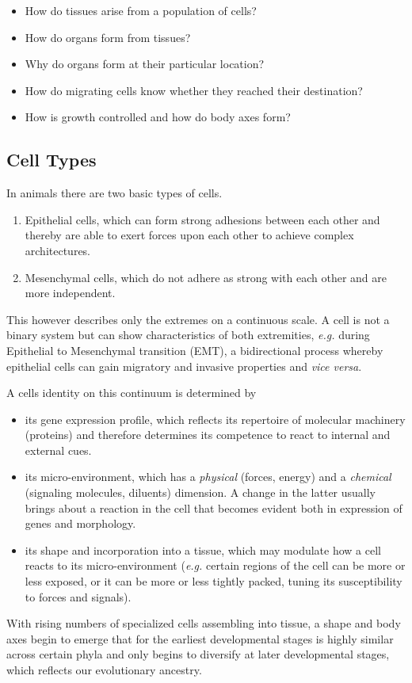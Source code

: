 \documentclass[10pt, b5paper, singlespacinge, twoside]{reedthesis} %
\providecommand{\tightlist}{%
  \setlength{\itemsep}{0pt}\setlength{\parskip}{0pt}}
\theoremstyle{definition}
\theoremstyle{definition}
\theoremstyle{definition}
\theoremstyle{remark}
\begin{document}
\begin{itemize}
\tightlist
\item
  How do tissues arise from a population of cells?
\item
  How do organs form from tissues?
\item
  Why do organs form at their particular location?
\item
  How do migrating cells know whether they reached their destination?
\item
  How is growth controlled and how do body axes form?
\end{itemize}
\hypertarget{intro-types}{%
\subsection{Cell Types}\label{intro-types}}

In animals there are two basic types of cells.
\begin{enumerate}
\def\labelenumi{\arabic{enumi}.}
\tightlist
\item
  Epithelial cells, which can form strong adhesions between each other and thereby are able to exert forces upon each other to achieve complex architectures.
\item
  Mesenchymal cells, which do not adhere as strong with each other and are more independent.
\end{enumerate}
This however describes only the extremes on a continuous scale. A cell is not a binary system but can show characteristics of both extremities, \emph{e.g.} during Epithelial to Mesenchymal transition (EMT), a bidirectional process whereby epithelial cells can gain migratory and invasive properties and \emph{vice versa}.

A cells identity on this continuum is determined by
\begin{itemize}
\tightlist
\item
  its gene expression profile, which reflects its repertoire of molecular machinery (proteins) and therefore determines its competence to react to internal and external cues.
\item
  its micro-environment, which has a \emph{physical} (forces, energy) and a \emph{chemical} (signaling molecules, diluents) dimension. A change in the latter usually brings about a reaction in the cell that becomes evident both in expression of genes and morphology.
\item
  its shape and incorporation into a tissue, which may modulate how a cell reacts to its micro-environment (\emph{e.g.} certain regions of the cell can be more or less exposed, or it can be more or less tightly packed, tuning its susceptibility to forces and signals).
\end{itemize}
With rising numbers of specialized cells assembling into tissue, a shape and body axes begin to emerge that for the earliest developmental stages is highly similar across certain phyla and only begins to diversify at later developmental stages, which reflects our evolutionary ancestry.
\end{document}
